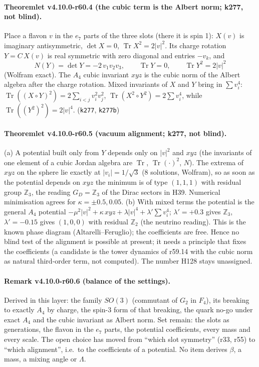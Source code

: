 \paragraph{Theoremlet v4.10.0-r60.4 (the cubic term is the Albert norm; k277, not blind).}
Place a flavon \(v\) in the \(e_7\) parts of the three slots (there it is spin 1): \(X(v)\) is imaginary antisymmetric, \(\det X=0\),
\(\operatorname{Tr}X^2=2|v|^2\).  Its charge rotation \(Y=C\,X(v)\) is real symmetric with zero diagonal and entries \(-v_k\), and
\[
N(Y)=\det Y=-2\,v_1v_2v_3,\qquad \operatorname{Tr}Y=0,\qquad \operatorname{Tr}Y^2=2|v|^2
\]
(Wolfram exact).  The \(A_4\) cubic invariant \(xyz\) is the cubic norm of the Albert algebra after the charge rotation.
Mixed invariants of \(X\) and \(Y\) bring in \(\sum v_i^4\): \(\operatorname{Tr}((X\circ Y)^2)=2\sum_{i<j}v_i^2v_j^2\), \(\operatorname{Tr}(X^2\circ Y^2)=2\sum v_i^4\),
while \(\operatorname{Tr}((Y^2)^2)=2|v|^4\).  (\texttt{k277}, \texttt{k277b})

\paragraph{Theoremlet v4.10.0-r60.5 (vacuum alignment; k277, not blind).}
(a) A potential built only from \(Y\) depends only on \(|v|^2\) and \(xyz\) (the invariants of one element of a cubic Jordan algebra are \(\operatorname{Tr}\),
\(\operatorname{Tr}(\cdot)^2\), \(N\)).  The extrema of \(xyz\) on the sphere lie exactly at \(|v_i|=1/\sqrt3\) (8 solutions, Wolfram), so as soon as the
potential depends on \(xyz\) the minimum is of type \((1,1,1)\) with residual group \(\mathbb Z_3\), the reading \(G_D=\mathbb Z_3\) of the Dirac sectors in
H39.  Numerical minimisation agrees for \(\kappa=\pm0.5,0.05\).
(b) With mixed terms the potential is the general \(A_4\) potential \(-\mu^2|v|^2+\kappa\,xyz+\lambda|v|^4+\lambda'\sum v_i^4\); \(\lambda'=+0.3\) gives
\(\mathbb Z_3\), \(\lambda'=-0.15\) gives \((1,0,0)\) with residual \(\mathbb Z_2\) (the neutrino reading).  This is the known phase diagram (Altarelli--Feruglio);
the coefficients are free.
Hence no blind test of the alignment is possible at present; it needs a principle that fixes the coefficients (a candidate is the tower dynamics
of r59.14 with the cubic norm as natural third-order term, not computed).  The number H128 stays unassigned.

\paragraph{Remark v4.10.0-r60.6 (balance of the settings).}
Derived in this layer: the family \(SO(3)\) (commutant of \(G_2\) in \(F_4\)), its breaking to exactly \(A_4\) by charge, the spin-3 form of that breaking,
the quark no-go under exact \(A_4\) and the cubic invariant as Albert norm.  Set remain: the slots as generations, the flavon in the \(e_7\) parts,
the potential coefficients, every mass and every scale.  The open choice has moved from ``which slot symmetry'' (r33, r55) to ``which alignment'',
i.e.\ to the coefficients of a potential.  No item derives \(\beta\), a mass, a mixing angle or \(\Lambda\).


